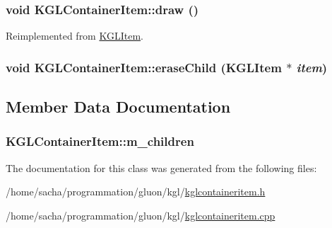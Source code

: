 \hypertarget{class_k_g_l_container_item_a785dc67935db5f335c74e4a7fb685b9}{
\subsubsection[{draw}]{\setlength{\rightskip}{0pt plus 5cm}void KGLContainerItem::draw ()}}
\label{class_k_g_l_container_item_a785dc67935db5f335c74e4a7fb685b9}




Reimplemented from \hyperlink{class_k_g_l_item_4e4766cf0362fa050bffdf5f45d6d13f}{KGLItem}.\hypertarget{class_k_g_l_container_item_a95f051ed6ff3c4603023a3edf48d1e9}{
\subsubsection[{eraseChild}]{\setlength{\rightskip}{0pt plus 5cm}void KGLContainerItem::eraseChild ({\bf KGLItem} $\ast$ {\em item})}}
\label{class_k_g_l_container_item_a95f051ed6ff3c4603023a3edf48d1e9}




\subsection{Member Data Documentation}
\hypertarget{class_k_g_l_container_item_1bfbe0d002c10f18687b3bd59b97f6d3}{
\subsubsection[{m\_\-children}]{ {\bf KGLContainerItem::m\_\-children}}}
\label{class_k_g_l_container_item_1bfbe0d002c10f18687b3bd59b97f6d3}




The documentation for this class was generated from the following files:\begin{CompactItemize}
\item 
/home/sacha/programmation/gluon/kgl/\hyperlink{kglcontaineritem_8h}{kglcontaineritem.h}\item 
/home/sacha/programmation/gluon/kgl/\hyperlink{kglcontaineritem_8cpp}{kglcontaineritem.cpp}\end{CompactItemize}
